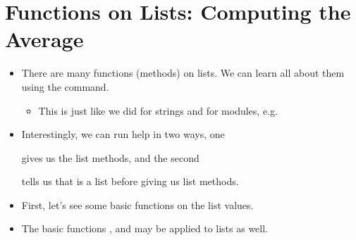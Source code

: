 \documentclass[letterpaper,10pt,english]{sphinxmanual}
\begin{document}
\section{Functions on Lists: Computing the Average}
\label{\detokenize{lecture_notes/lec08_lists1:functions-on-lists-computing-the-average}}\begin{itemize}
\item {} 
There are many functions (methods) on lists. We can learn all about
them using the  command.
\begin{itemize}
\item {} 
This is just like we did for strings and for modules, e.g.

%
\begin{sphinxVerbatim}[commandchars=\\\{\}]
 

\end{sphinxVerbatim}

\end{itemize}

\item {} 
Interestingly, we can run help in two ways, one

%
\begin{sphinxVerbatim}[commandchars=\\\{\}]
\end{sphinxVerbatim}

gives us the list methods, and the second

%
\begin{sphinxVerbatim}[commandchars=\\\{\}]
\end{sphinxVerbatim}

tells us that  is a list before giving us list methods.

\item {} 
First, let’s see some basic functions on the list values.

\item {} 
The basic functions ,  and  may be applied to lists as
well.


\end{itemize}
\end{document}
